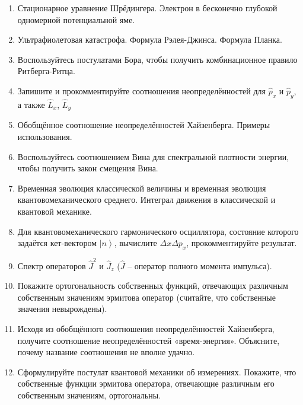 \documentclass[12pt]{article}
\begin{document}
\begin{enumerate}
\item\label{_24}
Стационарное уравнение Шрёдингера. Электрон в бесконечно глубокой одномерной потенциальной яме.

\item\label{_25}
Ультрафиолетовая катастрофа. Формула Рэлея-Джинса. Формула Планка.

\item\label{_26}
Воспользуйтесь постулатами Бора, чтобы получить комбинационное правило Ритберга-Ритца.

\item\label{_27}
Запишите и прокомментируйте соотношения неопределённостей для $\hat{p}_x$ и $\hat{p}_y$, а также $\hat{L}_x$, $\hat{L}_y$

\item\label{_28}
Обобщённое соотношение неопределённостей Хайзенберга. Примеры использования.

\item\label{_29}
Воспользуйтесь соотношением Вина для спектральной плотности энергии, чтобы получить закон смещения Вина.

\item\label{_30}
Временная эволюция классической величины и временная эволюция квантовомеханического среднего. Интеграл движения в классической и квантовой механике.

\item\label{_31}
Для квантовомеханического гармонического осциллятора, состояние которого задаётся кет-вектором $\left|n\right\rangle$, вычислите $\Delta x\Delta p_x$, прокомментируйте результат.

\item\label{_32}
Спектр операторов $\hat{J}^2$ и $\hat{J}_z$ ($\hat{J}$ -- оператор полного момента импульса).

\item\label{_33}
Покажите ортогональность собственных функций, отвечающих различным собственным значениям эрмитова оператор (считайте, что собственные значения невырождены).

\item\label{_34}
Исходя из обобщённого соотношения неопределённостей Хайзенберга, получите соотношение неопределённостей «время-энергия». Объясните, почему название соотношения не вполне удачно.

\item\label{_35}
Сформулируйте постулат квантовой механики об измерениях. Покажите, что собственные функции эрмитова оператора, отвечающие различным его собственным значениям, ортогональны.


\end{enumerate}
\end{document}
